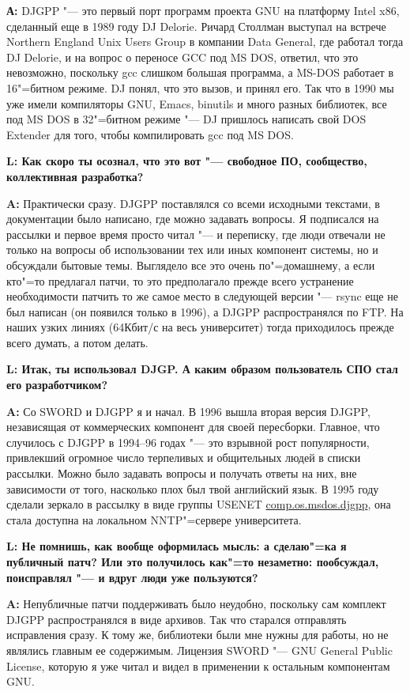 \documentclass[10pt, a5paper]{article}
\begin{document}
{\noindent \bf А:}  DJGPP "--- это первый порт программ проекта GNU на
платформу Intel x86, сделанный еще в 1989 году DJ Delorie. Ричард Столлман
выступал на встрече Northern England Unix Users Group в компании Data General,
где работал тогда DJ Delorie, и на вопрос о переносе GCC под MS DOS, ответил,
что это невозможно, поскольку gcc слишком большая программа, а MS-DOS работает
в 16"=битном режиме. DJ понял, что это вызов, и принял его. Так что в 1990 мы
уже имели компиляторы GNU, Emacs, binutils и много разных библиотек, все под
MS DOS в 32"=битном режиме "--- DJ пришлось написать свой DOS Extender для
того, чтобы компилировать gcc под MS DOS.

{\noindent \bf L: Как скоро ты осознал, что это вот "--- свободное ПО, сообщество, коллективная разработка?}

{\noindent \bf A:} Практически сразу. DJGPP поставлялся со всеми исходными текстами, в документации было
написано, где можно задавать вопросы. Я подписался на рассылки и первое время просто читал "--- и переписку,
где люди отвечали не только на вопросы об использовании тех или иных компонент системы, но и обсуждали бытовые
темы. Выглядело все это очень по"=домашнему, а если кто"=то предлагал патчи, то это предполагало прежде всего
устранение необходимости патчить то же самое место в следующей версии "--- rsync еще не был написан (он появился
только в 1996), а DJGPP распространялся по FTP. На наших узких линиях (64Кбит/с на весь университет) тогда
приходилось прежде всего думать, а потом делать.

{\noindent \bf L: Итак, ты использовал DJGP. А каким образом пользователь СПО стал его разработчиком?}

{\noindent \bf A:} Со SWORD и DJGPP я и начал. В 1996 вышла вторая версия DJGPP, независящая от
коммерческих компонент для своей пересборки. Главное, что случилось с DJGPP в
1994--96 годах "--- это взрывной рост популярности, привлекший огромное число
терпеливых и общительных людей в списки рассылки. Можно было задавать вопросы и
получать ответы на них, вне зависимости от того, насколько плох был твой
английский язык. В 1995 году сделали зеркало в рассылку в виде группы USENET
\url{comp.os.msdos.djgpp}, она стала доступна на локальном NNTP"=сервере университета.

{\noindent \bf L: Не помнишь, как вообще оформилась мысль: а сделаю"=ка я публичный патч? Или это получилось как"=то незаметно: пообсуждал, поисправлял "--- и вдруг люди уже пользуются?}

{\noindent \bf A:} Непубличные патчи поддерживать было неудобно, поскольку сам комплект
DJGPP распространялся в виде архивов. Так что старался отправлять исправления сразу.
К тому же, библиотеки были мне нужны для работы, но не являлись главным ее содержимым.
Лицензия SWORD "--- GNU General Public License, которую я уже читал и видел в применении
к остальным компонентам GNU. 
\end{document}
